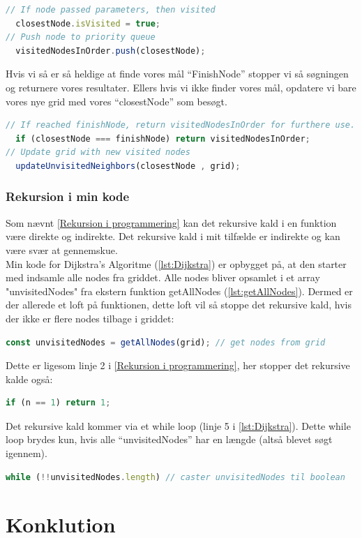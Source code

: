\documentclass[12pt]{article}
\begin{document}
\begin{lstlisting}[language=JavaScript]
// If node passed parameters, then visited
  closestNode.isVisited = true;
// Push node to priority queue
  visitedNodesInOrder.push(closestNode);
\end{lstlisting}
Hvis vi så er så heldige at finde vores mål “FinishNode” stopper vi så søgningen og returnere vores resultater. Ellers hvis vi ikke finder vores mål, opdatere vi bare vores nye grid med vores “closestNode” som besøgt. 
\begin{lstlisting}[language=JavaScript]
// If reached finishNode, return visitedNodesInOrder for furthere use.
  if (closestNode === finishNode) return visitedNodesInOrder;
// Update grid with new visited nodes
  updateUnvisitedNeighbors(closestNode , grid);
\end{lstlisting}
\subsubsection{Rekursion i min kode}
Som nævnt \ref{Rekursion i programmering} kan det rekursive kald i en funktion være direkte og indirekte. 
Det rekursive kald i mit tilfælde er indirekte og kan være svær at gennemskue. \\
Min kode for Dijkstra’s Algoritme (\ref{lst:Dijkstra}) er opbygget på, at den starter med indsamle alle nodes 
fra griddet. Alle nodes bliver opsamlet i et array "unvisitedNodes" fra ekstern funktion getAllNodes (\ref{lst:getAllNodes}). Dermed er der allerede et loft på funktionen, 
dette loft vil så stoppe det rekursive kald, hvis der ikke er flere nodes tilbage i griddet:
\begin{lstlisting}[language=JavaScript]
const unvisitedNodes = getAllNodes(grid); // get nodes from grid
\end{lstlisting}
Dette er ligesom linje 2 i \ref{Rekursion i programmering}, her stopper det rekursive kalde også: 
\begin{lstlisting}[language=JavaScript]
if (n == 1) return 1;
\end{lstlisting}
Det rekursive kald kommer via et while loop (linje 5 i \ref{lst:Dijkstra}). 
Dette while loop brydes kun, hvis alle “unvisitedNodes” har en længde (altså blevet søgt igennem). 
\begin{lstlisting}[language=JavaScript]
while (!!unvisitedNodes.length) // caster unvisitedNodes til boolean
\end{lstlisting}

\section{Konklution}
\end{document}
